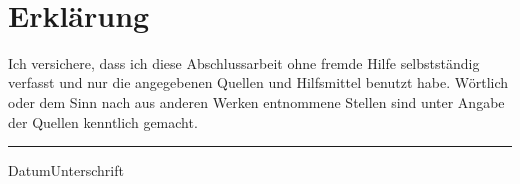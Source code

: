 
\maketitle
\clearpage
~
\newpage



\clearpage


\vspace{10ex}
\section*{Erklärung}
Ich  versichere, dass  ich diese  Abschlussarbeit ohne  fremde  Hilfe selbstständig
verfasst und  nur die  angegebenen Quellen und  Hilfsmittel benutzt  habe. Wörtlich
oder dem  Sinn nach  aus anderen  Werken entnommene Stellen  sind unter  Angabe der
Quellen kenntlich gemacht.
\vspace{10ex}\\

\hrule
{\small{Datum}}\hfill{\small{Unterschrift}}


\tableofcontents
\listoffigures


